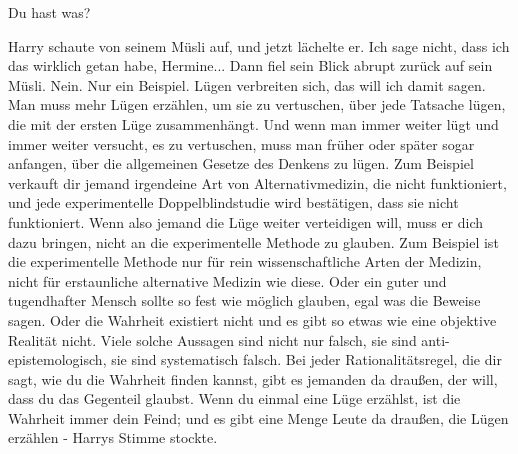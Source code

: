 \glqq{}Du hast was?\grqq{}

Harry schaute von seinem Müsli auf, und jetzt lächelte er. \glqq{}Ich sage nicht,
dass ich das wirklich getan habe, Hermine...\grqq{} Dann fiel sein Blick abrupt
zurück auf sein Müsli. \glqq{}Nein. Nur ein Beispiel. Lügen verbreiten sich, das
will ich damit sagen. Man muss mehr Lügen erzählen, um sie zu vertuschen, über
jede Tatsache lügen, die mit der ersten Lüge zusammenhängt. Und wenn man immer
weiter lügt und immer weiter versucht, es zu vertuschen, muss man früher oder
später sogar anfangen, über die allgemeinen Gesetze des Denkens zu lügen. Zum
Beispiel verkauft dir jemand irgendeine Art von Alternativmedizin, die nicht
funktioniert, und jede experimentelle Doppelblindstudie wird bestätigen, dass
sie nicht funktioniert. Wenn also jemand die Lüge weiter verteidigen will, muss
er dich dazu bringen, nicht an die experimentelle Methode zu glauben. Zum
Beispiel ist die experimentelle Methode nur für rein wissenschaftliche Arten der
Medizin, nicht für erstaunliche alternative Medizin wie diese. Oder ein guter
und tugendhafter Mensch sollte so fest wie möglich glauben, egal was die Beweise
sagen. Oder die Wahrheit existiert nicht und es gibt so etwas wie eine objektive
Realität nicht. Viele solche Aussagen sind nicht nur falsch, sie sind
anti-epistemologisch, sie sind systematisch falsch. Bei jeder
Rationalitätsregel, die dir sagt, wie du die Wahrheit finden kannst, gibt es
jemanden da draußen, der will, dass du das Gegenteil glaubst. Wenn du einmal
eine Lüge erzählst, ist die Wahrheit immer dein Feind; und es gibt eine Menge
Leute da draußen, die Lügen erzählen -\grqq{} Harrys Stimme stockte.

